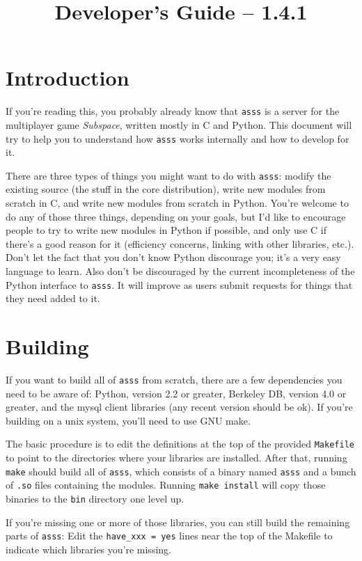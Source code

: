 \documentclass{article}
\title{\asss{} Developer's Guide -- 1.4.1}
\newcommand{\asss}{\texttt{asss}}
\begin{document}
\maketitle

\section{Introduction}

If you're reading this, you probably already know that \asss{} is a
server for the multiplayer game \emph{Subspace}, written mostly in C and
Python. This document will try to help you to understand how \asss{}
works internally and how to develop for it.

There are three types of things you might want to do with \asss{}:
modify the existing source (the stuff in the core distribution), write
new modules from scratch in C, and write new modules from scratch in
Python. You're welcome to do any of those three things, depending on
your goals, but I'd like to encourage people to try to write new modules
in Python if possible, and only use C if there's a good reason for it
(efficiency concerns, linking with other libraries, etc.). Don't let the
fact that you don't know Python discourage you; it's a very easy
language to learn. Also don't be discouraged by the current
incompleteness of the Python interface to \asss{}. It will improve as
users submit requests for things that they need added to it.


\section{Building}

If you want to build all of \asss{} from scratch, there are a few
dependencies you need to be aware of: Python, version 2.2 or greater,
Berkeley DB, version 4.0 or greater, and the mysql client libraries (any
recent version should be ok). If you're building on a unix system,
you'll need to use GNU make.

The basic procedure is to edit the definitions at the top of the
provided \verb/Makefile/ to point to the directories where your
libraries are installed. After that, running \verb/make/ should build
all of \asss{}, which consists of a binary named \verb/asss/ and a bunch
of \verb/.so/ files containing the modules. Running \verb/make install/
will copy those binaries to the \verb/bin/ directory one level up.

If you're missing one or more of those libraries, you can still build
the remaining parts of \asss{}: Edit the \verb/have_xxx = yes/ lines
near the top of the Makefile to indicate which libraries you're missing.
\end{document}
